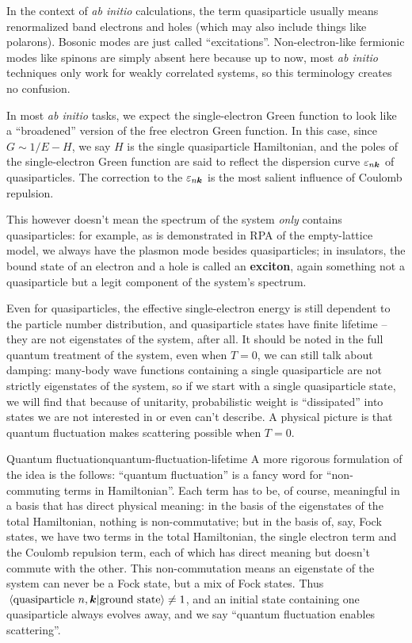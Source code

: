 \documentclass[hyperref, a4paper, 12pt]{report}
\newcommand*{\concept}[1]{{\textbf{#1}}}
\newcommand*{\abinitio}{\textit{ab initio}}
\begin{document}
In the context of \abinitio{} calculations,
the term quasiparticle usually means 
renormalized band electrons and holes
(which may also include things like polarons).
Bosonic modes are just called ``excitations''.
Non-electron-like fermionic modes like spinons are simply absent here 
because up to now, most \abinitio{} techniques only work for 
weakly correlated systems,
so this terminology creates no confusion.

In most \abinitio{} tasks, 
we expect the single-electron Green function 
to look like a ``broadened'' version of the free electron Green function.
In this case, 
since $G \sim 1 / E - H$,
we say $H$ is the single quasiparticle Hamiltonian,
and the poles of the single-electron Green function 
are said to reflect the dispersion curve $\varepsilon_{n \vb*{k}}$ of quasiparticles.
The correction to the $\varepsilon_{n \vb*{k}}$ 
is the most salient influence of Coulomb repulsion.

This however doesn't mean the spectrum of the system 
\emph{only} contains quasiparticles: 
for example, as is demonstrated in RPA of the empty-lattice model,
we always have the plasmon mode besides quasiparticles; 
in insulators, 
the bound state of an electron and a hole is called an \concept{exciton},
again something not a quasiparticle but a legit component of the system's spectrum. 

Even for quasiparticles, 
the effective single-electron energy 
is still dependent to the particle number distribution,
and quasiparticle states have finite lifetime -- 
they are not eigenstates of the system, after all.
It should be noted in the full quantum treatment of the system,
even when $T = 0$,
we can still talk about damping:
many-body wave functions containing a single quasiparticle 
are not strictly eigenstates of the system, 
so if we start with a single quasiparticle state, 
we will find that because of unitarity, 
probabilistic weight is ``dissipated'' into states we are not interested in or even can't describe. 
A physical picture is that quantum fluctuation
makes scattering possible when $T = 0$.

\begin{theorybox}{Quantum fluctuation}{quantum-fluctuation-lifetime}
    A more rigorous formulation of the idea is the follows: 
    ``quantum fluctuation'' is a fancy word for ``non-commuting terms in Hamiltonian''. 
    Each term has to be, of course, meaningful in a basis that has direct physical meaning:
    in the basis of the eigenstates of the total Hamiltonian,
    nothing is non-commutative; 
    but in the basis of, say, Fock states, 
    we have two terms in the total Hamiltonian, 
    the single electron term and the Coulomb repulsion term, 
    each of which has direct meaning but doesn't commute with the other. 
    This non-commutation means 
    an eigenstate of the system can never be a Fock state, 
    but a mix of Fock states. 
    Thus $\braket*{\text{quasiparticle $n, \vb*{k}$}}{\text{ground state}} \neq 1$,
    and an initial state containing one quasiparticle 
    always evolves away,
    and we say ``quantum fluctuation enables scattering''.
\end{theorybox}
\end{document}
